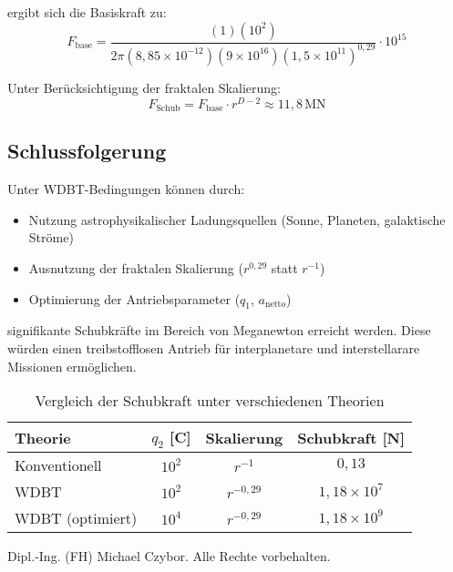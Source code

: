 \documentclass[11pt, a4paper]{article}
\begin{document}
ergibt sich die Basiskraft zu:
\[
F_{\text{base}} = \frac{(1)(10^2)}{2\pi (8,85 \times 10^{-12})(9 \times 10^{16})(1,5 \times 10^{11})^{0,29}} \cdot 10^{15} 
\]

Unter Berücksichtigung der fraktalen Skalierung:
\[
F_{\text{Schub}} = F_{\text{base}} \cdot r^{D-2} \approx 11,8\,\text{MN}
\]

\subsection{Schlussfolgerung}

Unter WDBT-Bedingungen können durch:
\begin{itemize}
\item Nutzung astrophysikalischer Ladungsquellen (Sonne, Planeten, galaktische Ströme)
\item Ausnutzung der fraktalen Skalierung ($r^{0,29}$ statt $r^{-1}$)
\item Optimierung der Antriebsparameter ($q_1$, $a_{\text{netto}}$)
\end{itemize}

signifikante Schubkräfte im Bereich von Meganewton erreicht werden. Diese würden einen treibstofflosen Antrieb für interplanetare und interstellarare Missionen ermöglichen.

\begin{table}[h]
\centering
\caption{Vergleich der Schubkraft unter verschiedenen Theorien}
\begin{tabular}{lccc}
\hline
Theorie & $q_2$ [C] & Skalierung & Schubkraft [N] \\
\hline
Konventionell & $10^2$ & $r^{-1}$ & $0,13$ \\
WDBT & $10^2$ & $r^{-0,29}$ & $1,18 \times 10^7$ \\
WDBT (optimiert) & $10^4$ & $r^{-0,29}$ & $1,18 \times 10^9$ \\
\hline
\end{tabular}
\end{table}

\textcopyright{} \the\year{} Dipl.-Ing. (FH) Michael Czybor. Alle Rechte vorbehalten.
\end{document}
